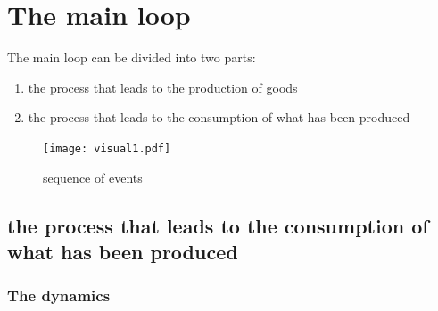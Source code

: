 \documentclass{article}
\begin{document}
\newpage 
\section{The main loop}
The main loop can be divided into two parts:
\begin{enumerate}
	\item the process that leads to the production of goods
	\item the process that leads to the consumption of what has been produced
\end{enumerate}

\begin{figure}[htp]
	\centering
\texttt{[image: visual1.pdf]}
	\caption{sequence of events}
	\label{fig:clockcolor}
\end{figure}

\subsection{the process that leads to the consumption of what has been produced}
\subsubsection{The dynamics}
\end{document}
